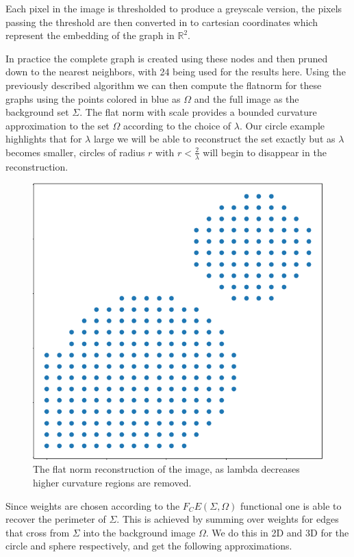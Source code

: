 \documentclass[12pt]{article}
\begin{document}
Each pixel in the image is thresholded to produce a greyscale version, the pixels passing the threshold are then converted in to cartesian coordinates which represent the embedding of the graph in $\mathbb{R}^2$. 

In practice the complete graph is created using these nodes and then pruned down to the nearest neighbors, with 24 being used for the results here. Using the previously described algorithm we can then compute the flatnorm for these graphs using the points colored in blue as $\Omega$ and the full image as the background set $\Sigma$. The flat norm with scale provides a bounded curvature approximation to the set $\Omega$ according to the choice of $\lambda$. Our circle example highlights that for $\lambda$ large we will be able to reconstruct the set exactly but as $\lambda$ becomes smaller, circles of radius $r$ with $r < \frac{2}{\lambda}$ will begin to disappear in the reconstruction.

\begin{figure}[H]
	\centering
	\includegraphics[scale=0.5]{circleslamb.png}
	\caption{The flat norm reconstruction of the image, as lambda decreases higher curvature regions are removed.}
\end{figure}


Since weights are chosen according to the $F_CE(\Sigma,\Omega)$ functional one is able to recover the perimeter of $\Sigma$. This is achieved by summing over weights for edges that cross from $\Sigma$ into the background image $\Omega$. We do this in 2D and 3D for the circle and sphere respectively, and get the following approximations.
\end{document}

